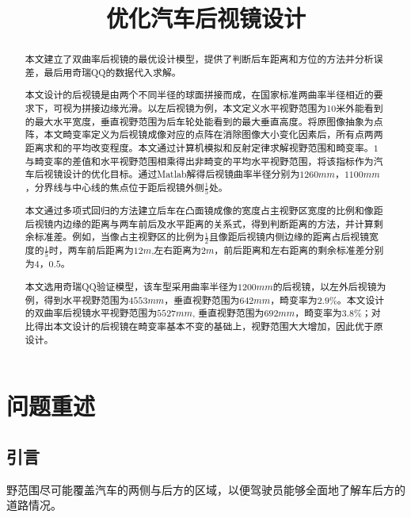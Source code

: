 \documentclass[withoutpreface,bwprint]{cumcmthesis} %
\title{优化汽车后视镜设计}
\begin{document}
 \maketitle
\begin{abstract}
 
\par 本文建立了双曲率后视镜的最优设计模型，提供了判断后车距离和方位的方法并分析误差，最后用奇瑞QQ的数据代入求解。
\par 本⽂设计的后视镜是由两个不同半径的球面拼接而成，在国家标准两曲率半径相近的要求下，可视为拼接边缘光滑。以左后视镜为例，本文定义水平视野范围为10米外能看到的最大水平宽度，垂直视野范围为后车轮处能看到的最大垂直高度。将原图像抽象为点阵，本文畸变率定义为后视镜成像对应的点阵在消除图像大小变化因素后，所有点两两距离求和的平均改变程度。本文通过计算机模拟和反射定律求解视野范围和畸变率。$1$与畸变率的差值和水平视野范围相乘得出非畸变的平均水平视野范围，将该指标作为汽车后视镜设计的优化目标。通过Matlab解得后视镜曲率半径分别为$1260mm$，$1100mm$，分界线与中心线的焦点位于距后视镜外侧$\frac{1}{5}$处。
\par 本文通过多项式回归的方法建立后车在凸面镜成像的宽度占主视野区宽度的比例和像距后视镜内边缘的距离与两车前后及水平距离的关系式，得到判断距离的方法，并计算剩余标准差。例如，当像占主视野区的比例为$\frac{1}{2}$且像距后视镜内侧边缘的距离占后视镜宽度的$\frac{1}{5}$时，两车前后距离为$12m$,左右距离为$2m$，前后距离和左右距离的剩余标准差分别为$4$，$0.5$。
\par 本⽂选⽤奇瑞QQ验证模型，该车型采⽤曲率半径为$1200mm$的后视镜，以左外后视镜为例，得到水平视野范围为$4553mm$，垂直视野范围为$642mm$，畸变率为$2.9\%$。本⽂设计的双曲率后视镜水平视野范围为$5527mm$, 垂直视野范围为$692mm$，畸变率为$3.8\%$；对⽐得出本文设计的后视镜在畸变率基本不变的基础上，视野范围⼤⼤增加，因此优于原设计。

 
\end{abstract}

\tableofcontents
\newpage

\section{问题重述}
 

\subsection{引言}

\par 野范围尽可能覆盖汽车的两侧与后方的区域，以便驾驶员能够全面地了解车后方的道路情况。
\end{document}
